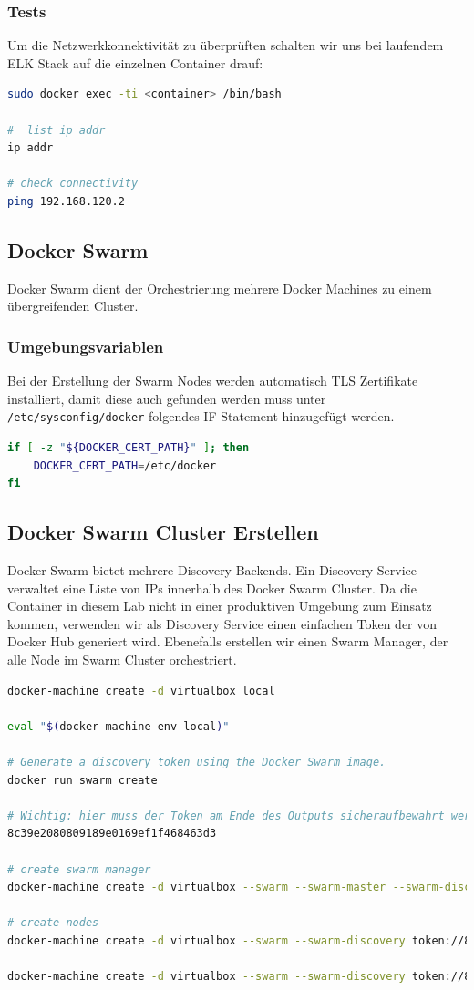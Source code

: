 \subsubsection{Tests}
Um die Netzwerkkonnektivität zu überprüften schalten wir uns bei laufendem ELK Stack auf die einzelnen Container drauf:
\begin{lstlisting}[language=bash]
sudo docker exec -ti <container> /bin/bash

#  list ip addr
ip addr 

# check connectivity
ping 192.168.120.2
\end{lstlisting}

\subsection{Docker Swarm}
Docker Swarm dient der Orchestrierung mehrere Docker Machines zu einem übergreifenden Cluster.

\subsubsection{Umgebungsvariablen}
Bei der Erstellung der Swarm Nodes werden automatisch TLS Zertifikate installiert, damit diese auch gefunden werden muss unter \lstinline[]|/etc/sysconfig/docker| folgendes IF Statement hinzugefügt werden. 
\begin{lstlisting}[caption=/etc/sysconfig/docker, language=bash]
if [ -z "${DOCKER_CERT_PATH}" ]; then
	DOCKER_CERT_PATH=/etc/docker
fi
\end{lstlisting}

\subsection{Docker Swarm Cluster Erstellen}
Docker Swarm bietet mehrere Discovery Backends. Ein Discovery Service verwaltet eine Liste von IPs innerhalb des Docker Swarm Cluster. Da die Container in diesem Lab nicht in einer produktiven Umgebung zum Einsatz kommen, verwenden wir als Discovery Service einen einfachen Token der von Docker Hub generiert wird. Ebenefalls erstellen wir einen Swarm Manager, der alle Node im Swarm Cluster orchestriert.

\begin{lstlisting}[language=bash]
docker-machine create -d virtualbox local

eval "$(docker-machine env local)"

# Generate a discovery token using the Docker Swarm image.
docker run swarm create

# Wichtig: hier muss der Token am Ende des Outputs sicheraufbewahrt werden: 
8c39e2080809189e0169ef1f468463d3

# create swarm manager
docker-machine create -d virtualbox --swarm --swarm-master --swarm-discovery token://8c39e2080809189e0169ef1f468463d3 swarm-master

# create nodes
docker-machine create -d virtualbox --swarm --swarm-discovery token://8c39e2080809189e0169ef1f468463d3 node01

docker-machine create -d virtualbox --swarm --swarm-discovery token://8c39e2080809189e0169ef1f468463d3 node01
\end{lstlisting}

